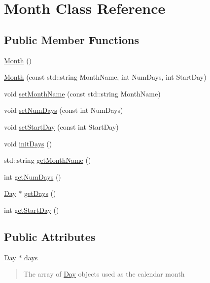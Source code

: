 \hypertarget{class_month}{}\section{Month Class Reference}
\label{class_month}
\subsection*{Public Member Functions}
\begin{DoxyCompactItemize}
\item 
\hyperlink{class_month_a36882c55ece9c4210ec1b01bd665ec89}{Month} ()
\item 
\hyperlink{class_month_ae2b064f3abf4c38a9e2527920831ed3f}{Month} (const std\+::string Month\+Name, int Num\+Days, int Start\+Day)
\item 
void \hyperlink{class_month_a77dee92af5de872d8579b1b142473f90}{set\+Month\+Name} (const std\+::string Month\+Name)
\item 
void \hyperlink{class_month_a661a751213b495884ec258d3e6c687e9}{set\+Num\+Days} (const int Num\+Days)
\item 
void \hyperlink{class_month_ae9730715451148a5a4629b9c450e8103}{set\+Start\+Day} (const int Start\+Day)
\item 
void \hyperlink{class_month_a9309f01ffc97e5bbb13bf8f5801f2aec}{init\+Days} ()
\item 
std\+::string \hyperlink{class_month_a1cb2ba2c0e646b961f55d99e9f5b74de}{get\+Month\+Name} ()
\item 
int \hyperlink{class_month_a5ab8e306d9f603872dcf68b7bc771aa0}{get\+Num\+Days} ()
\item 
\hyperlink{class_day}{Day} $\ast$ \hyperlink{class_month_ab562a3d12216892324cfcfb2ba9503a6}{get\+Days} ()
\item 
int \hyperlink{class_month_a5fd5d2bf55df35f09262198e416e1906}{get\+Start\+Day} ()
\end{DoxyCompactItemize}
\subsection*{Public Attributes}
\begin{DoxyCompactItemize}
\item 
\hypertarget{class_month_a8ade9e4309247818f04ce3e7f7682d6f}{}\label{class_month_a8ade9e4309247818f04ce3e7f7682d6f} 
\hyperlink{class_day}{Day} $\ast$ \hyperlink{class_month_a8ade9e4309247818f04ce3e7f7682d6f}{days}
\begin{DoxyCompactList}\small\item\em \begin{quote}
The array of \hyperlink{class_day}{Day} objects used as the calendar month \end{quote}
\end{DoxyCompactList}\end{DoxyCompactItemize}


